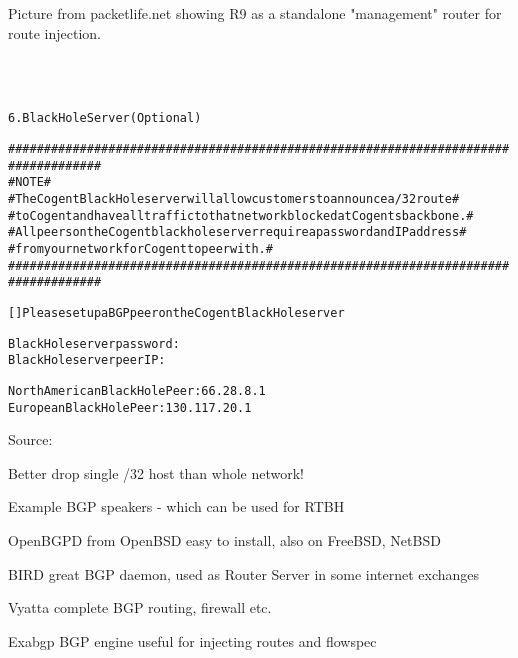 \documentclass[20pt,landscape,a4paper,footrule]{foils}
\begin{document}

Picture from packetlife.net showing  R9 as a standalone "management" router for route injection.

{\footnotesize
{}\\
\\
}



\begin{alltt}\footnotesize
6.  Black Hole Server (Optional)

   ###################################################################################
   #                           NOTE                                                  #
   #  The Cogent Black Hole server will allow customers to announce a /32 route      #
   #  to Cogent and have all traffic to that network blocked at Cogents backbone.    #
   #  All peers on the Cogent black hole server require a password and IP address    #
   #  from your network for Cogent to peer with.                                     #
   ###################################################################################

       [   ]  Please set up a BGP peer on the Cogent Black Hole server

       Black Hole server password:
       Black Hole server peer IP:

       North American Black Hole Peer:  66.28.8.1
       European Black Hole Peer:  130.117.20.1
\end{alltt}

Source:\\
{\footnotesize{}}

\centerline{Better drop single /32 host than whole network!}


\begin{list1}
\item Example BGP speakers - which can be used for RTBH

\item OpenBGPD from OpenBSD easy to install, also on FreeBSD, NetBSD
\item BIRD  great BGP daemon, used as Router Server in some internet exchanges
\item Vyatta  complete BGP routing, firewall etc.
\item Exabgp  BGP engine useful for injecting routes and flowspec
\end{list1}
\end{document}
